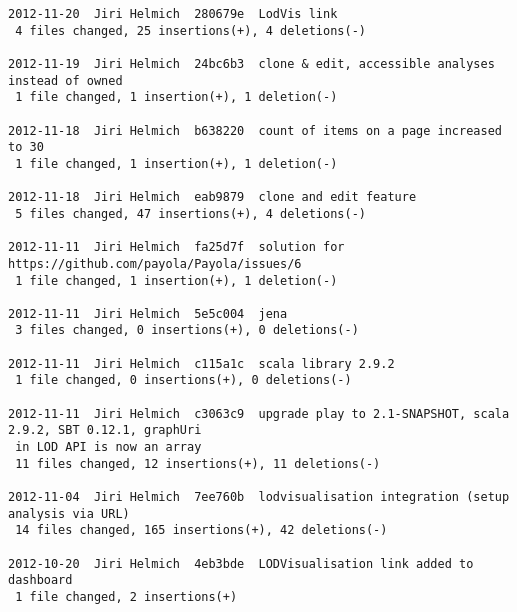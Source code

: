 {\begin{verbatim}
2012-11-20  Jiri Helmich  280679e  LodVis link
 4 files changed, 25 insertions(+), 4 deletions(-)

2012-11-19  Jiri Helmich  24bc6b3  clone & edit, accessible analyses instead of owned
 1 file changed, 1 insertion(+), 1 deletion(-)

2012-11-18  Jiri Helmich  b638220  count of items on a page increased to 30
 1 file changed, 1 insertion(+), 1 deletion(-)

2012-11-18  Jiri Helmich  eab9879  clone and edit feature
 5 files changed, 47 insertions(+), 4 deletions(-)

2012-11-11  Jiri Helmich  fa25d7f  solution for https://github.com/payola/Payola/issues/6
 1 file changed, 1 insertion(+), 1 deletion(-)

2012-11-11  Jiri Helmich  5e5c004  jena
 3 files changed, 0 insertions(+), 0 deletions(-)

2012-11-11  Jiri Helmich  c115a1c  scala library 2.9.2
 1 file changed, 0 insertions(+), 0 deletions(-)

2012-11-11  Jiri Helmich  c3063c9  upgrade play to 2.1-SNAPSHOT, scala 2.9.2, SBT 0.12.1, graphUri
 in LOD API is now an array
 11 files changed, 12 insertions(+), 11 deletions(-)

2012-11-04  Jiri Helmich  7ee760b  lodvisualisation integration (setup analysis via URL)
 14 files changed, 165 insertions(+), 42 deletions(-)

2012-10-20  Jiri Helmich  4eb3bde  LODVisualisation link added to dashboard
 1 file changed, 2 insertions(+)
 \end{verbatim}
}
